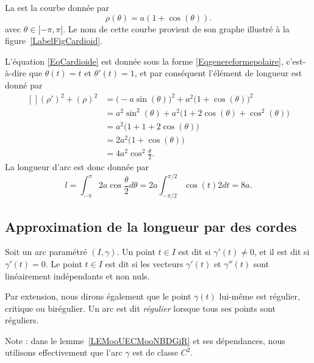 \begin{example}
    La  est la courbe donnée par
    \begin{equation}        \label{EqCardioide}
        \rho(\theta)=a(1+\cos(\theta)).
    \end{equation}
    avec $\theta\in\mathopen[ -\pi , \pi \mathclose]$. Le nom de cette courbe provient de son graphe illustré à la figure~\ref{LabelFigCardioid}.
    \newcommand{\CaptionFigCardioid}{Une cardioïde, $\rho=1+\cos(\theta)$.}
    

    L'équation \eqref{EqCardioide} est donnée sous la forme \eqref{Eqgenereformepolaire}, c'est-à-dire que $\theta(t)=t$ et $\theta'(t)=1$, et par conséquent l'élément de longueur est donné par
    \begin{equation}
        \begin{aligned}[]
            (\rho')^2+(\rho)^2&=\big( -a\sin(\theta) \big)^2+a^2\big( 1+\cos(\theta) \big)^2\\
                    &=a^2\sin^2(\theta)+a^2\big( 1+2\cos(\theta)+\cos^2(\theta) \big)\\
                    &=a^2\big( 1+1+2\cos(\theta) \big)\\
                    &=2a^2\big( 1+\cos(\theta) \big)\\
                    &=4a^2\cos^2\frac{ \theta }{2}.
        \end{aligned}
    \end{equation}
    La longueur d'arc est donc donnée par
    \begin{equation}
        l=\int_{-\pi}^{\pi}2a\cos\frac{ \theta }{2}d\theta=2a\int_{-\pi/2}^{\pi/2}\cos(t)2dt=8a.
    \end{equation}
\end{example}

\subsection{Approximation de la longueur par des cordes}

\begin{definition}
    Soit un arc paramétré $(I,\gamma)$. Un point $t\in I$ est dit  si $\gamma'(t)\neq 0$, et il est dit  si $\gamma'(t)=0$. Le point $t\in I$ est dit  si les vecteurs $\gamma'(t)$ et $\gamma''(t)$ sont linéairement indépendants et non nuls.

    Par extension, nous dirons également que le point $\gamma(t)$ lui-même est régulier, critique ou birégulier. Un arc est dit \emph{régulier} lorsque tous ses points sont réguliers.
\end{definition}
Note : dans le lemme~\ref{LEMooUECMooNBDGiR} et ses dépendances, nous utilisons effectivement que l'arc \( \gamma\) est de classe \( C^2\).


